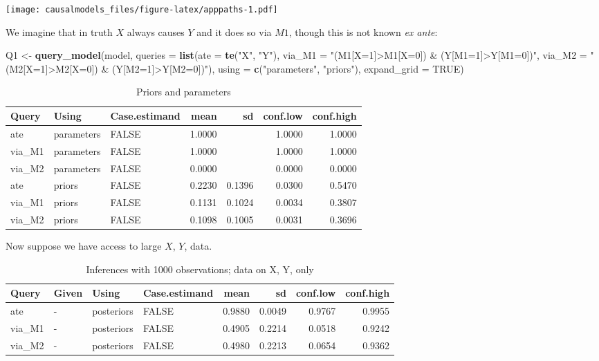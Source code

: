 \documentclass[
  12pt,
]{book}
\newenvironment{Shaded}{\begin{snugshade}}{\end{snugshade}}
\newcommand{\AttributeTok}[1]{\textcolor[rgb]{0.13,0.29,0.53}{#1}}
\newcommand{\ConstantTok}[1]{\textcolor[rgb]{0.56,0.35,0.01}{#1}}
\newcommand{\FunctionTok}[1]{\textcolor[rgb]{0.13,0.29,0.53}{\textbf{#1}}}
\newcommand{\NormalTok}[1]{#1}
\newcommand{\OtherTok}[1]{\textcolor[rgb]{0.56,0.35,0.01}{#1}}
\newcommand{\StringTok}[1]{\textcolor[rgb]{0.31,0.60,0.02}{#1}}
\begin{document}
\texttt{[image: causalmodels\_files/figure-latex/apppaths-1.pdf]}

We imagine that in truth \(X\) always causes \(Y\) and it does so via \(M1\), though this is not known \emph{ex ante}:

\begin{Shaded}
\begin{Highlighting}[]
\NormalTok{Q1 }\OtherTok{\textless{}{-}} \FunctionTok{query\_model}\NormalTok{(model, }
  \AttributeTok{queries =} \FunctionTok{list}\NormalTok{(}\AttributeTok{ate =} \FunctionTok{te}\NormalTok{(}\StringTok{"X"}\NormalTok{, }\StringTok{"Y"}\NormalTok{), }
                 \AttributeTok{via\_M1 =} \StringTok{"(M1[X=1]\textgreater{}M1[X=0]) \& (Y[M1=1]\textgreater{}Y[M1=0])"}\NormalTok{, }
                 \AttributeTok{via\_M2 =} \StringTok{"(M2[X=1]\textgreater{}M2[X=0]) \& (Y[M2=1]\textgreater{}Y[M2=0])"}\NormalTok{), }
  \AttributeTok{using =} \FunctionTok{c}\NormalTok{(}\StringTok{"parameters"}\NormalTok{, }\StringTok{"priors"}\NormalTok{),}
  \AttributeTok{expand\_grid =} \ConstantTok{TRUE}\NormalTok{) }
\end{Highlighting}
\end{Shaded}

\begin{table}

\caption{\label{tab:apppaths3}Priors and parameters}
\centering
\begin{tabular}[t]{l|l|l|r|r|r|r}
\hline
Query & Using & Case.estimand & mean & sd & conf.low & conf.high\\
\hline
ate & parameters & FALSE & 1.0000 &  & 1.0000 & 1.0000\\
\hline
via\_M1 & parameters & FALSE & 1.0000 &  & 1.0000 & 1.0000\\
\hline
via\_M2 & parameters & FALSE & 0.0000 &  & 0.0000 & 0.0000\\
\hline
ate & priors & FALSE & 0.2230 & 0.1396 & 0.0300 & 0.5470\\
\hline
via\_M1 & priors & FALSE & 0.1131 & 0.1024 & 0.0034 & 0.3807\\
\hline
via\_M2 & priors & FALSE & 0.1098 & 0.1005 & 0.0031 & 0.3696\\
\hline
\end{tabular}
\end{table}

Now suppose we have access to large \(X\), \(Y\), data.

\begin{table}

\caption{\label{tab:apppath4}Inferences with 1000 observations; data on X, Y, only}
\centering
\begin{tabular}[t]{l|l|l|l|r|r|r|r}
\hline
Query & Given & Using & Case.estimand & mean & sd & conf.low & conf.high\\
\hline
ate & - & posteriors & FALSE & 0.9880 & 0.0049 & 0.9767 & 0.9955\\
\hline
via\_M1 & - & posteriors & FALSE & 0.4905 & 0.2214 & 0.0518 & 0.9242\\
\hline
via\_M2 & - & posteriors & FALSE & 0.4980 & 0.2213 & 0.0654 & 0.9362\\
\hline
\end{tabular}
\end{table}
\end{document}
